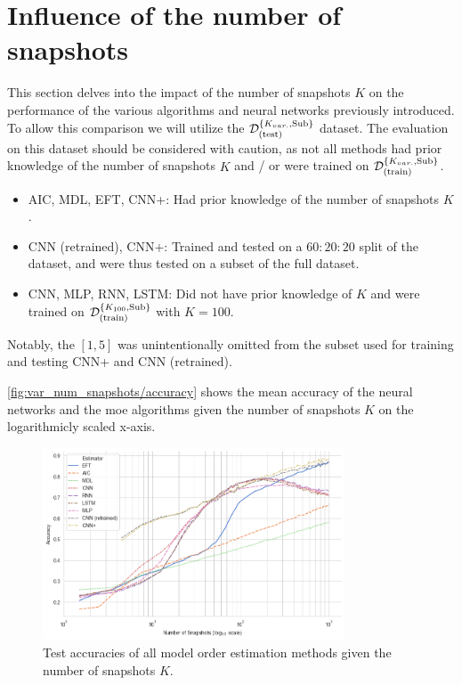 \section{Influence of the number of snapshots}
\label{sec:influence_num_snapshots}

This section delves into the impact of the number of snapshots \( K \) on the performance of the various algorithms and
neural networks previously introduced. To allow this comparison we will utilize the \( \mathcal{D}^{\{K_{var.},\text{Sub}\}}_{(\text{test})} \) dataset.
The evaluation on this dataset should be considered with caution, as not all methods had prior knowledge of the number of
snapshots \( K \) and / or were trained on \( \mathcal{D}^{\{K_{var.},\text{Sub}\}}_{(\text{train})} \).
\begin{itemize}
    \item AIC, MDL, EFT, CNN+: Had prior knowledge of the number of snapshots \( K \).
    \item CNN (retrained), CNN+: Trained and tested on a \( 60:20:20 \) split of the dataset, and were thus tested on a subset of the full dataset.
    \item CNN, MLP, RNN, LSTM: Did not have prior knowledge of \( K \) and were trained on \( \mathcal{D}^{\{K_{100},\text{Sub}\}}_{(\text{train})} \) with \( K = 100 \).
\end{itemize}

Notably, the \( [1,5] \) was unintentionally omitted from the subset used for training and testing CNN+ and CNN (retrained).

\autoref{fig:var_num_snapshots/accuracy} shows the mean accuracy of the neural networks and the \gls{moe} algorithms given
the number of snapshots \( K \) on the logarithmicly scaled x-axis.

\begin{figure}[H]
    \centering
    \includegraphics[width=0.8\textwidth]{figures/07_Evaluation/num_snapshots/accuracy+.png}
    \caption{Test accuracies of all model order estimation methods given the number of snapshots \( K \).}
    \label{fig:var_num_snapshots/accuracy}
\end{figure}

